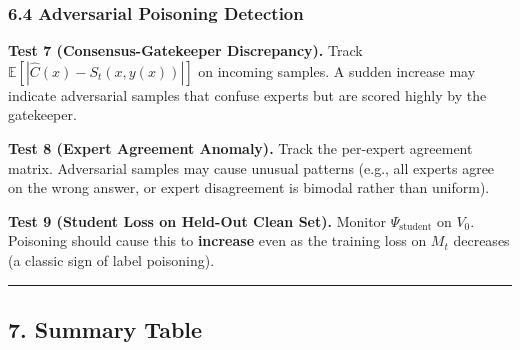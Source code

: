 \documentclass[
  12pt,
]{article}
\begin{document}
\subsubsection{6.4 Adversarial Poisoning
Detection}\label{adversarial-poisoning-detection}

\textbf{Test 7 (Consensus-Gatekeeper Discrepancy).} Track
\(\mathbb{E}[|\hat{C}(x) - S_t(x, y(x))|]\) on incoming samples. A
sudden increase may indicate adversarial samples that confuse experts
but are scored highly by the gatekeeper.

\textbf{Test 8 (Expert Agreement Anomaly).} Track the per-expert
agreement matrix. Adversarial samples may cause unusual patterns (e.g.,
all experts agree on the wrong answer, or expert disagreement is bimodal
rather than uniform).

\textbf{Test 9 (Student Loss on Held-Out Clean Set).} Monitor
\(\Psi_{\text{student}}\) on \(V_0\). Poisoning should cause this to
\textbf{increase} even as the training loss on \(M_t\) decreases (a
classic sign of label poisoning).

\begin{center}\rule{0.5\linewidth}{0.5pt}\end{center}

\subsection{7. Summary Table}\label{summary-table}
\end{document}
